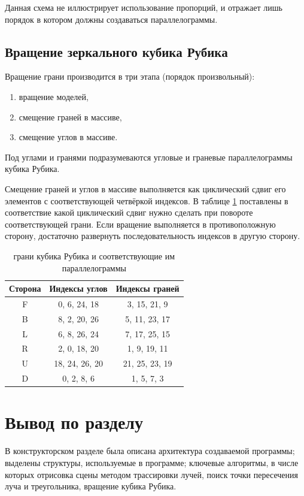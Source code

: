\documentclass[a4paper, 14pt]{report} %
\begin{document}
	Данная схема не иллюстрирует использование пропорций, и отражает лишь порядок в котором должны создаваться параллелограммы.
	
	\subsection{Вращение зеркального кубика Рубика}
	
	Вращение грани производится в три этапа (порядок произвольный):
	\begin{enumerate}
		\item вращение моделей,
		\item смещение граней в массиве,
		\item смещение углов в массиве.
	\end{enumerate}

	Под углами и гранями подразумеваются угловые и граневые параллелограммы кубика Рубика.
	
	Смещение граней и углов в массиве выполняется как циклический сдвиг его элементов с соответствующей четвёркой индексов. В таблице \ref{tabular:cube_indexes} поставлены в соответствие какой циклический сдвиг нужно сделать при повороте соответствующей грани. Если вращение выполняется в противоположную сторону, достаточно развернуть последовательность индексов в другую сторону.
	
	\begin{table}[!ht]
		\centering
		\caption{грани кубика Рубика и соответствующие им параллелограммы}
		\label{tabular:cube_indexes}
		\begin{tabular}{|c|c|c|}
			\hline
			Сторона & Индексы углов & Индексы граней \\
			\hline
			\hline
			F & 0, 6, 24, 18	& 3, 15, 21, 9		\\ \hline
			B & 8, 2, 20, 26	& 5, 11, 23, 17		\\ \hline
			L & 6, 8, 26, 24	& 7, 17, 25, 15		\\ \hline
			R & 2, 0, 18, 20	& 1, 9, 19, 11		\\ \hline
			U & 18, 24, 26, 20	& 21, 25, 23, 19	\\ \hline
			D & 0, 2, 8, 6		& 1, 5, 7, 3		\\ \hline
		\end{tabular}
	\end{table}
	
	\section{Вывод по разделу}
	В конструкторском разделе была описана архитектура создаваемой программы; выделены структуры, используемые в программе; ключевые алгоритмы, в числе которых отрисовка сцены методом трассировки лучей, поиск точки пересечения луча и треугольника, вращение кубика Рубика.
	
\end{document}
